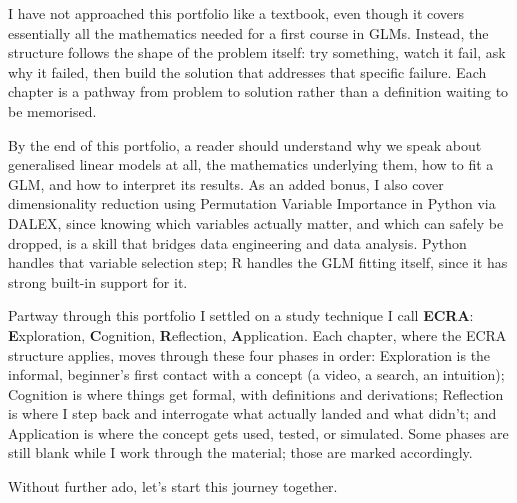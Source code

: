 \documentclass[11pt,a4paper,openany]{scrbook}
\begin{document}
I have not approached this portfolio like a textbook, even though it covers essentially all the mathematics needed for a first course in GLMs. Instead, the structure follows the shape of the problem itself: try something, watch it fail, ask why it failed, then build the solution that addresses that specific failure. Each chapter is a pathway from problem to solution rather than a definition waiting to be memorised.

By the end of this portfolio, a reader should understand why we speak about generalised linear models at all, the mathematics underlying them, how to fit a GLM, and how to interpret its results. As an added bonus, I also cover dimensionality reduction using Permutation Variable Importance in Python via DALEX, since knowing which variables actually matter, and which can safely be dropped, is a skill that bridges data engineering and data analysis. Python handles that variable selection step; R handles the GLM fitting itself, since it has strong built-in support for it.

Partway through this portfolio I settled on a study technique I call \textbf{ECRA}: \textbf{E}xploration, \textbf{C}ognition, \textbf{R}eflection, \textbf{A}pplication. Each chapter, where the ECRA structure applies, moves through these four phases in order: Exploration is the informal, beginner's first contact with a concept (a video, a search, an intuition); Cognition is where things get formal, with definitions and derivations; Reflection is where I step back and interrogate what actually landed and what didn't; and Application is where the concept gets used, tested, or simulated. Some phases are still blank while I work through the material; those are marked accordingly.

Without further ado, let's start this journey together.

\mainmatter






\end{document}
